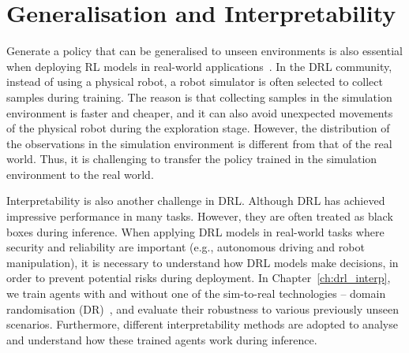 \section{Generalisation and Interpretability}
Generate a policy that can be generalised to unseen environments is also essential when deploying RL models in real-world applications~\cite{kirk2021survey}. In the DRL community, instead of using a physical robot, a robot simulator is often selected to collect samples during training. The reason is that collecting samples in the simulation environment is faster and cheaper, and it can also avoid unexpected movements of the physical robot during the exploration stage. However, the distribution of the observations in the simulation environment is different from that of the real world. Thus, it is challenging to transfer the policy trained in the simulation environment to the real world.

Interpretability is also another challenge in DRL. Although DRL has achieved impressive performance in many tasks. However, they are often treated as black boxes during inference. When applying DRL models in real-world tasks where security and reliability are important (e.g., autonomous driving and robot manipulation), it is necessary to understand how DRL models make decisions, in order to prevent potential risks during deployment. In Chapter~\ref{ch:drl_interp}, we train agents with and without one of the sim-to-real technologies -- domain randomisation (DR)~\cite{andrychowicz2018learning,james2017transferring,peng2018sim,sadeghi2017cad2rl,tobin2017domain}, and evaluate their robustness to various previously unseen scenarios. Furthermore, different interpretability methods are adopted to analyse and understand how these trained agents work during inference.

